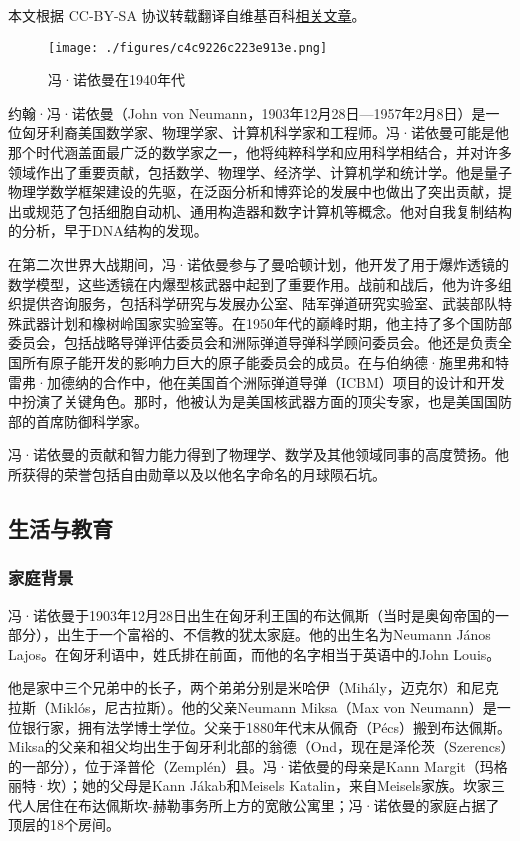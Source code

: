 
本文根据 CC-BY-SA 协议转载翻译自维基百科\href{https://en.wikipedia.org/wiki/John_von_Neumann}{相关文章}。

\begin{figure}[ht]
\centering
\texttt{[image: ./figures/c4c9226c223e913e.png]}
\caption{冯·诺依曼在1940年代} \label{fig_Neuman_1}
\end{figure}
约翰·冯·诺依曼（John von Neumann，1903年12月28日—1957年2月8日）是一位匈牙利裔美国数学家、物理学家、计算机科学家和工程师。冯·诺依曼可能是他那个时代涵盖面最广泛的数学家之一，他将纯粹科学和应用科学相结合，并对许多领域作出了重要贡献，包括数学、物理学、经济学、计算机学和统计学。他是量子物理学数学框架建设的先驱，在泛函分析和博弈论的发展中也做出了突出贡献，提出或规范了包括细胞自动机、通用构造器和数字计算机等概念。他对自我复制结构的分析，早于DNA结构的发现。

在第二次世界大战期间，冯·诺依曼参与了曼哈顿计划，他开发了用于爆炸透镜的数学模型，这些透镜在内爆型核武器中起到了重要作用。战前和战后，他为许多组织提供咨询服务，包括科学研究与发展办公室、陆军弹道研究实验室、武装部队特殊武器计划和橡树岭国家实验室等。在1950年代的巅峰时期，他主持了多个国防部委员会，包括战略导弹评估委员会和洲际弹道导弹科学顾问委员会。他还是负责全国所有原子能开发的影响力巨大的原子能委员会的成员。在与伯纳德·施里弗和特雷弗·加德纳的合作中，他在美国首个洲际弹道导弹（ICBM）项目的设计和开发中扮演了关键角色。那时，他被认为是美国核武器方面的顶尖专家，也是美国国防部的首席防御科学家。

冯·诺依曼的贡献和智力能力得到了物理学、数学及其他领域同事的高度赞扬。他所获得的荣誉包括自由勋章以及以他名字命名的月球陨石坑。
\subsection{生活与教育}  
\subsubsection{家庭背景}  
冯·诺依曼于1903年12月28日出生在匈牙利王国的布达佩斯（当时是奥匈帝国的一部分），出生于一个富裕的、不信教的犹太家庭。他的出生名为Neumann János Lajos。在匈牙利语中，姓氏排在前面，而他的名字相当于英语中的John Louis。

他是家中三个兄弟中的长子，两个弟弟分别是米哈伊（Mihály，迈克尔）和尼克拉斯（Miklós，尼古拉斯）。他的父亲Neumann Miksa（Max von Neumann）是一位银行家，拥有法学博士学位。父亲于1880年代末从佩奇（Pécs）搬到布达佩斯。Miksa的父亲和祖父均出生于匈牙利北部的翁德（Ond，现在是泽伦茨（Szerencs）的一部分），位于泽普伦（Zemplén）县。冯·诺依曼的母亲是Kann Margit（玛格丽特·坎）；她的父母是Kann Jákab和Meisels Katalin，来自Meisels家族。坎家三代人居住在布达佩斯坎-赫勒事务所上方的宽敞公寓里；冯·诺依曼的家庭占据了顶层的18个房间。


